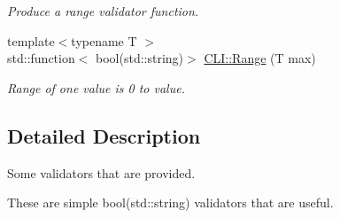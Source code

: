\begin{DoxyCompactItemize}
\begin{DoxyCompactList}\small\item\em Produce a range validator function. \end{DoxyCompactList}\item 
\mbox{\label{group__validator__group_ga3c9d28f65c8120540e1865cf78d65ece}} 
{\footnotesize template$<$typename T $>$ }\\std\+::function$<$ bool(std\+::string)$>$ \hyperlink{group__validator__group_ga3c9d28f65c8120540e1865cf78d65ece}{C\+L\+I\+::\+Range} (T max)
\begin{DoxyCompactList}\small\item\em Range of one value is 0 to value. \end{DoxyCompactList}\end{DoxyCompactItemize}


\subsection{Detailed Description}
Some validators that are provided. 

These are simple {\ttfamily bool(std\+::string)} validators that are useful. 